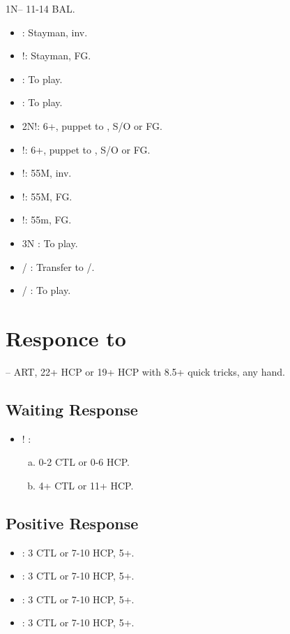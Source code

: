 \documentclass[12pt,twoside,a5paper]{report}%
\begin{document}
	1N-- 11-14 BAL.
	\begin{itemize}
	\renewcommand{\labelitemi}{}
	\item {} : Stayman, inv.
	\item {}!: Stayman, FG.
	\item {} : To play.
	\item {} : To play.
	\item 2N!: 6+\cl{}, puppet to , S/O or FG.
	\item {}!: 6+\di{}, puppet to , S/O or FG.
	\item {}!: 55M, inv.
	\item {}!: 55M, FG.
	\item {}!: 55m, FG.
	\item 3N : To play.
	\item {}/ : Transfer to /\sp{}.
	\item {}/ : To play.
	\end{itemize}

\chapter*{Responce to }
	-- ART, 22+ HCP or 19+ HCP with 8.5+ quick tricks, any hand.
	\section*{Waiting Response}
	\begin{itemize}
	\renewcommand{\labelitemi}{}
		\item {}! : 
			\begin{enumerate}[(a)]
			\item 0-2 CTL or 0-6 HCP.
			\item 4+ CTL or 11+ HCP.
			\end{enumerate}
	\end{itemize}
	\section*{Positive Response}
	\begin{itemize}
	\renewcommand{\labelitemi}{}
		\item {} : 3 CTL or 7-10 HCP, 5+\he{}.
		\item {} : 3 CTL or 7-10 HCP, 5+\sp{}.
		\item {} : 3 CTL or 7-10 HCP, 5+\cl{}.
		\item {} : 3 CTL or 7-10 HCP, 5+\di{}.
	\end{itemize}
\end{document}
